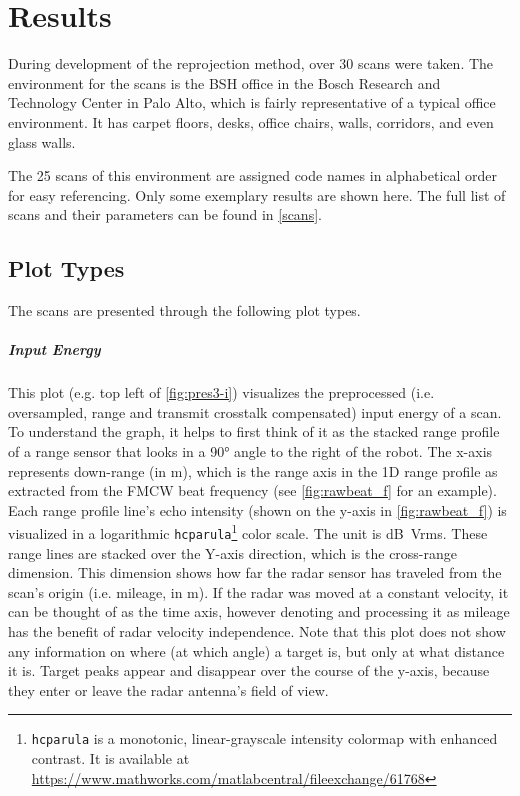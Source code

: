 \section{Results}\label{results}

During development of the reprojection method, over 30 scans were taken. The environment for the scans is the BSH office in the Bosch Research and Technology Center in Palo Alto, which is fairly representative of a typical office environment. It has carpet floors, desks, office chairs, walls, corridors, and even glass walls.

The 25 scans of this environment are assigned code names in alphabetical order for easy referencing. Only some exemplary results are shown here. The full list of scans and their parameters can be found in \cref{scans}.

\subsection{Plot Types}
The scans are presented through the following plot types.

\subparagraph{Input Energy}
This plot (e.g. top left of \cref{fig:pres3-i}) visualizes the preprocessed (i.e. oversampled, range and transmit crosstalk compensated) input energy of a scan. To understand the graph, it helps to first think of it as the stacked range profile of a range sensor that looks in a \ang{90} angle to the right of the robot. The x-axis represents down-range (in \si{m}), which is the range axis in the 1D range profile as extracted from the FMCW beat frequency (see \cref{fig:rawbeat_f} for an example). Each range profile line's echo intensity (shown on the y-axis in \cref{fig:rawbeat_f}) is visualized in a logarithmic \texttt{hcparula}\footnote{\texttt{hcparula} is a monotonic, linear-grayscale intensity colormap with enhanced contrast. It is available at \url{https://www.mathworks.com/matlabcentral/fileexchange/61768}} color scale. The unit is \si{dB Vrms}. These range lines are stacked over the Y-axis direction, which is the cross-range dimension. This dimension shows how far the radar sensor has traveled from the scan's origin (i.e. mileage, in \si{m}). If the radar was moved at a constant velocity, it can be thought of as the time axis, however denoting and processing it as mileage has the benefit of radar velocity independence. Note that this plot does not show any information on where (at which angle) a target is, but only at what distance it is. Target peaks appear and disappear over the course of the y-axis, because they enter or leave the radar antenna's field of view.

